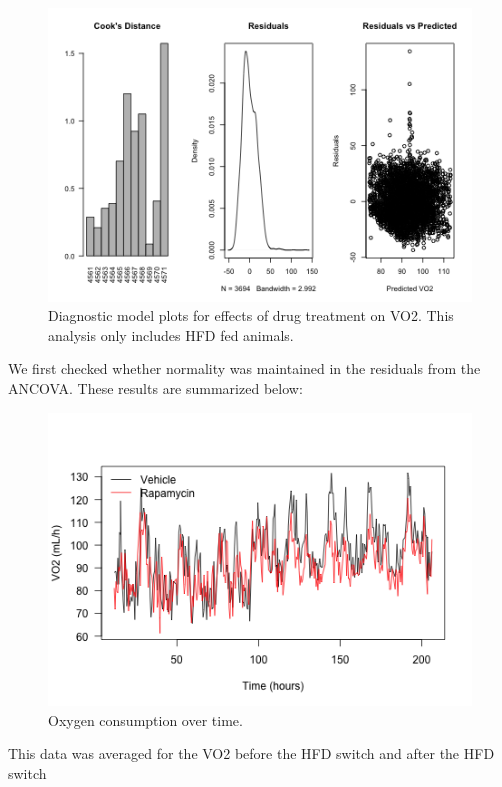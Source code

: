 \documentclass[]{article}
\begin{document}
\begin{figure}[htbp]
\centering
\includegraphics{figures/vo2-diagnostic-plots-1.png}
\caption{Diagnostic model plots for effects of drug treatment on VO2.
This analysis only includes HFD fed animals.}
\end{figure}

We first checked whether normality was maintained in the residuals from
the ANCOVA. These results are summarized below:

\begin{figure}[htbp]
\centering
\includegraphics{figures/vo2-time-course-1.png}
\caption{Oxygen consumption over time.}
\end{figure}

This data was averaged for the VO2 before the HFD switch and after the
HFD switch
\end{document}
